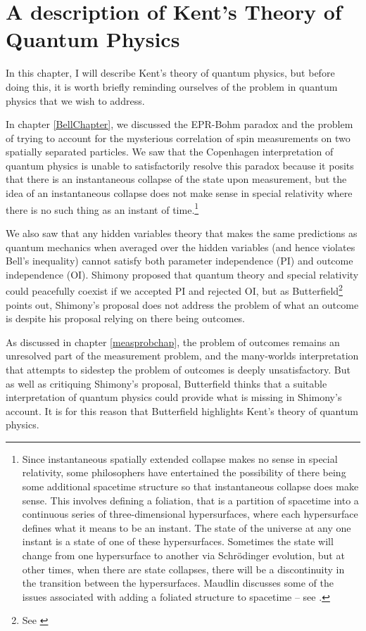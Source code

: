 \chapter{A description of Kent's Theory of Quantum Physics\label{kentchapterdesc}}

In this chapter, I will describe Kent's theory of quantum physics, but before doing this, it is worth briefly reminding ourselves of the problem in quantum physics that we wish to address. 

In chapter \ref{BellChapter}, we discussed the EPR-Bohm paradox and the problem of trying to account for the mysterious correlation of spin measurements on two spatially separated particles. We saw that the Copenhagen interpretation of quantum physics is unable to satisfactorily resolve this paradox because it posits that there is an instantaneous collapse of the state upon measurement, but the idea of an instantaneous collapse does not make sense in special relativity where there is no such thing as an instant of time.\footnote{Since instantaneous spatially extended collapse makes no sense in special relativity, some philosophers have entertained the possibility of there being some additional spacetime structure so that instantaneous collapse does make sense. This involves defining a foliation, that is a partition of spacetime into a continuous series of three-dimensional hypersurfaces, where each hypersurface defines what it means to be an instant. The state of the universe at any one instant is a state of one of these hypersurfaces. Sometimes the state will change from one hypersurface to another via Schr\"{o}dinger evolution, but at other times, when there are state collapses, there will be a discontinuity in the transition between the hypersurfaces. Maudlin discusses some of the issues associated with adding a foliated structure to spacetime -- see \cite{Maudlin3}.} 

We also saw that any hidden variables theory that makes the same predictions as quantum mechanics when averaged over the hidden variables (and hence violates Bell's inequality) cannot satisfy both  parameter independence (PI) and outcome independence (OI). Shimony proposed that quantum theory and special relativity could peacefully coexist if we accepted PI and rejected OI, but as Butterfield\footnote{See \cite{Butterfield}} points out, Shimony's proposal  does not address the problem of what an outcome is despite his proposal relying on there being outcomes. 

As discussed in chapter \ref{measprobchap}, the problem of outcomes remains an unresolved part of the measurement problem, and the many-worlds interpretation that attempts to sidestep the problem of outcomes is deeply unsatisfactory. But as well as critiquing Shimony's proposal, Butterfield thinks that a suitable interpretation of quantum physics could provide what is missing in Shimony's account. It is for this reason that Butterfield highlights Kent's theory of quantum physics.

